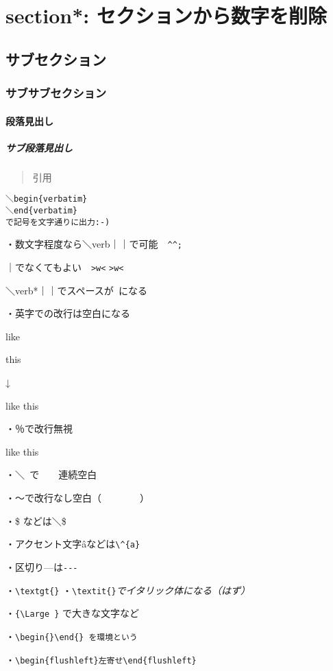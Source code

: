 \documentclass[a4paper,12pt,papersize,twocolumn,titlepage]{jsarticle}
\begin{document}
\section*{section*: セクションから数字を削除}
\subsection{サブセクション}
\subsubsection{サブサブセクション}
\paragraph{段落見出し}
\subparagraph{サブ段落見出し}
\begin{quotation}
引用
\end{quotation}

\begin{verbatim}
＼begin{verbatim}
＼end{verbatim}
で記号を文字通りに出力:-)
\end{verbatim}

・数文字程度なら＼verb｜｜で可能　\verb|^^;|

｜でなくてもよい　\verb">w<" \verb->w<-

＼verb*｜｜でスペースが\verb*" "になる


・英字での改行は空白になる

like

this

↓

like
this


・％で改行無視

like%
this


・＼\verb*" "で\ \ \ \ 連続空白


・～で改行なし空白（~~~~~~~~）


・\$ などは＼\$


・アクセント文字\^{a}などは\verb"\^{a}"


・区切り---は\verb"---"


・\verb"\textgt{}"
・\verb"\textit{}"\textit{でイタリック体になる（はず）}

・\verb*"{\Large }" で{\Large 大きな}文字など


・\verb"\begin{}\end{} を環境という"


・\verb"\begin{flushleft}左寄せ\end{flushleft}"
\end{document}
